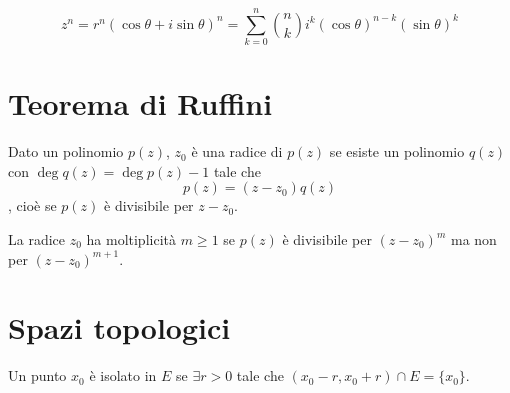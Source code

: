 \documentclass[a4paper]{article}
\begin{document}
\[
    z^n = r^n {(\cos \theta + i\sin\theta)}^n = \sum_{k=0}^n \binom{n}{k}
    i^k {(\cos\theta)}^{n-k}{(\sin\theta)}^k
\]

\section{Teorema di Ruffini}

Dato un polinomio \(p(z)\), \(z_0\) è una radice di \(p(z)\) se esiste
un polinomio \(q(z)\) con \(\deg q(z) = \deg p(z) - 1\)
tale che \[p(z) = (z-z_0)q(z)\], cioè se \(p(z)\) è divisibile per \(z-z_0\).

La radice \(z_0\) ha moltiplicità \(m \geq 1\) se
\(p(z)\) è divisibile per \((z-z_0)^m\) ma non per \((z-z_0)^{m+1}\).


\pagebreak

\section{Spazi topologici}

Un punto \(x_0\) è isolato in \(E\) se \(\exists r > 0\) tale che \((x_0 - r, x_0 + r) \cap E = \{x_0\}\).
\end{document}

